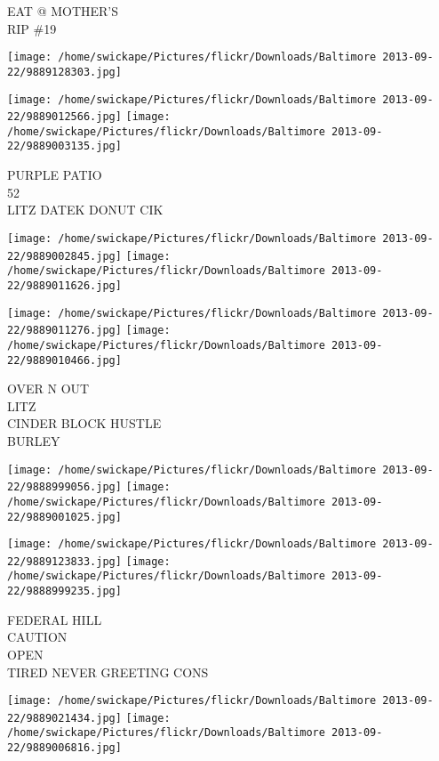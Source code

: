 \documentclass[10pt,letterpaper]{article}
\begin{document}
EAT @ MOTHER'S\\
RIP \#19\\
\pagebreak

\texttt{[image: /home/swickape/Pictures/flickr/Downloads/Baltimore 2013-09-22/9889128303.jpg]}

\vspace{0.25in}
\texttt{[image: /home/swickape/Pictures/flickr/Downloads/Baltimore 2013-09-22/9889012566.jpg]}
\texttt{[image: /home/swickape/Pictures/flickr/Downloads/Baltimore 2013-09-22/9889003135.jpg]}

PURPLE PATIO\\
52\\
LITZ DATEK DONUT CIK\\
\pagebreak

\texttt{[image: /home/swickape/Pictures/flickr/Downloads/Baltimore 2013-09-22/9889002845.jpg]}
\texttt{[image: /home/swickape/Pictures/flickr/Downloads/Baltimore 2013-09-22/9889011626.jpg]}

\texttt{[image: /home/swickape/Pictures/flickr/Downloads/Baltimore 2013-09-22/9889011276.jpg]}
\texttt{[image: /home/swickape/Pictures/flickr/Downloads/Baltimore 2013-09-22/9889010466.jpg]}

OVER N OUT\\
LITZ\\
CINDER BLOCK HUSTLE\\
BURLEY\\
\pagebreak

\texttt{[image: /home/swickape/Pictures/flickr/Downloads/Baltimore 2013-09-22/9888999056.jpg]}
\texttt{[image: /home/swickape/Pictures/flickr/Downloads/Baltimore 2013-09-22/9889001025.jpg]}

\texttt{[image: /home/swickape/Pictures/flickr/Downloads/Baltimore 2013-09-22/9889123833.jpg]}
\texttt{[image: /home/swickape/Pictures/flickr/Downloads/Baltimore 2013-09-22/9888999235.jpg]}

FEDERAL HILL\\
CAUTION\\
OPEN\\
TIRED NEVER GREETING CONS\\
\pagebreak

\texttt{[image: /home/swickape/Pictures/flickr/Downloads/Baltimore 2013-09-22/9889021434.jpg]}
\texttt{[image: /home/swickape/Pictures/flickr/Downloads/Baltimore 2013-09-22/9889006816.jpg]}
\end{document}
